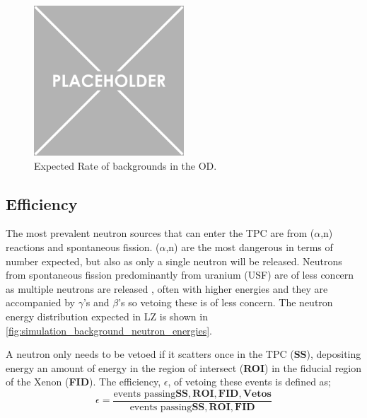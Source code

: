 \begin{figure}
    \centering
    \includegraphics[width=0.5\textwidth]{Figures/Placeholder.png}
    \caption{Expected Rate of backgrounds in the OD.}
    \label{fig:OD_estimated_background_rate}
\end{figure}



\subsection{Efficiency}
\label{sec:od_simulation_efficiency}
\par
The most prevalent neutron sources that can enter the TPC are from ($\alpha$,n) reactions and spontaneous fission.
($\alpha$,n) are the most dangerous in terms of number expected, but also as only a single neutron will be released.
Neutrons from spontaneous fission predominantly from uranium (USF) are of less concern as multiple neutrons are released \cite{usf_ref}, often with higher energies and they are accompanied by $\gamma$'s and $\beta$'s so vetoing these is of less concern.
The neutron energy distribution expected in LZ is shown in \autoref{fig:simulation_background_neutron_energies}.


\par
A neutron only needs to be vetoed if it scatters once in the TPC (\textbf{SS}), depositing energy an amount of energy in the region of intersect (\textbf{ROI}) in the fiducial region of the Xenon (\textbf{FID}).
The efficiency, $\epsilon$, of vetoing these events is defined as;
\begin{equation}
    \epsilon = \frac{\text{events passing}\mathbf{SS, ROI, FID, Vetos}}{\text{events passing}\mathbf{SS, ROI, FID}}
    \label{eq:neutron_efficiency}
\end{equation}

